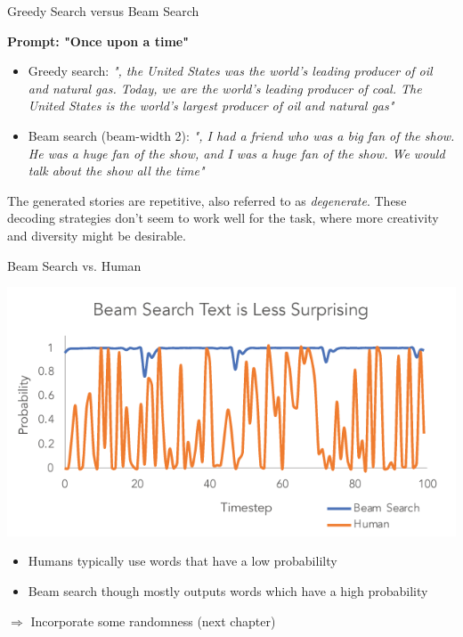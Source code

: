     


\begin{vbframe}{Greedy Search versus Beam Search}

\vspace{2ex}
\textbf{Prompt: "Once upon a time"}
\begin{itemize}
\item Greedy search: \textit{", the United States was the world's leading producer of oil and natural gas. Today, we are the world's leading producer of coal. 
The United States is the world's largest producer of oil and natural gas"}
\item Beam search (beam-width 2): \textit{", I had a friend who was a big fan of the show. He was a huge fan of the show, and I was a huge fan of the show. We would talk about the show all the time"}
\end{itemize}
\vspace{2ex}
The generated stories are repetitive, also referred to as \textit{degenerate}. These decoding strategies don't seem to work well for the task, where more creativity and diversity might be desirable.\\
\vspace{2ex}



\end{vbframe}


\begin{frame}{Beam Search vs. Human}

\begin{center}
    \includegraphics[width=0.7\linewidth]{figure/beam_vs_human.png}
\end{center}

\begin{itemize}
    \item Humans typically use words that have a low probabililty
    \item Beam search though mostly outputs words which have a high probability
\end{itemize}

\vfill

$\Rightarrow$ Incorporate some randomness (next chapter)

\end{frame}



\endlecture
